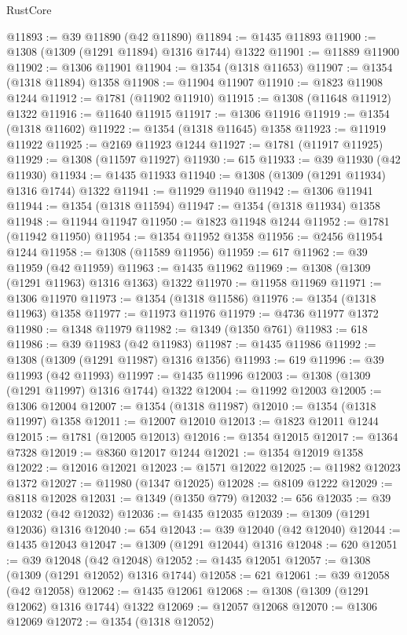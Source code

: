 \begin{lexlean}{RustCore}
\begin{coremodule}
@11893 := @39 @11890 (@42 @11890)
@11894 := @1435 @11893
@11900 := @1308 (@1309 (@1291 @11894) @1316 @1744) @1322
@11901 := @11889 @11900
@11902 := @1306 @11901
@11904 := @1354 (@1318 @11653)
@11907 := @1354 (@1318 @11894) @1358
@11908 := @11904 @11907
@11910 := @1823 @11908 @1244
@11912 := @1781 (@11902 @11910)
@11915 := @1308 (@11648 @11912) @1322
@11916 := @11640 @11915
@11917 := @1306 @11916
@11919 := @1354 (@1318 @11602)
@11922 := @1354 (@1318 @11645) @1358
@11923 := @11919 @11922
@11925 := @2169 @11923 @1244
@11927 := @1781 (@11917 @11925)
@11929 := @1308 (@11597 @11927)
@11930 := 615
@11933 := @39 @11930 (@42 @11930)
@11934 := @1435 @11933
@11940 := @1308 (@1309 (@1291 @11934) @1316 @1744) @1322
@11941 := @11929 @11940
@11942 := @1306 @11941
@11944 := @1354 (@1318 @11594)
@11947 := @1354 (@1318 @11934) @1358
@11948 := @11944 @11947
@11950 := @1823 @11948 @1244
@11952 := @1781 (@11942 @11950)
@11954 := @1354 @11952 @1358
@11956 := @2456 @11954 @1244
@11958 := @1308 (@11589 @11956)
@11959 := 617
@11962 := @39 @11959 (@42 @11959)
@11963 := @1435 @11962
@11969 := @1308 (@1309 (@1291 @11963) @1316 @1363) @1322
@11970 := @11958 @11969
@11971 := @1306 @11970
@11973 := @1354 (@1318 @11586)
@11976 := @1354 (@1318 @11963) @1358
@11977 := @11973 @11976
@11979 := @4736 @11977 @1372
@11980 := @1348 @11979
@11982 := @1349 (@1350 @761)
@11983 := 618
@11986 := @39 @11983 (@42 @11983)
@11987 := @1435 @11986
@11992 := @1308 (@1309 (@1291 @11987) @1316 @1356)
@11993 := 619
@11996 := @39 @11993 (@42 @11993)
@11997 := @1435 @11996
@12003 := @1308 (@1309 (@1291 @11997) @1316 @1744) @1322
@12004 := @11992 @12003
@12005 := @1306 @12004
@12007 := @1354 (@1318 @11987)
@12010 := @1354 (@1318 @11997) @1358
@12011 := @12007 @12010
@12013 := @1823 @12011 @1244
@12015 := @1781 (@12005 @12013)
@12016 := @1354 @12015
@12017 := @1364 @7328
@12019 := @8360 @12017 @1244
@12021 := @1354 @12019 @1358
@12022 := @12016 @12021
@12023 := @1571 @12022
@12025 := @11982 @12023 @1372
@12027 := @11980 (@1347 @12025)
@12028 := @8109 @1222
@12029 := @8118 @12028
@12031 := @1349 (@1350 @779)
@12032 := 656
@12035 := @39 @12032 (@42 @12032)
@12036 := @1435 @12035
@12039 := @1309 (@1291 @12036) @1316
@12040 := 654
@12043 := @39 @12040 (@42 @12040)
@12044 := @1435 @12043
@12047 := @1309 (@1291 @12044) @1316
@12048 := 620
@12051 := @39 @12048 (@42 @12048)
@12052 := @1435 @12051
@12057 := @1308 (@1309 (@1291 @12052) @1316 @1744)
@12058 := 621
@12061 := @39 @12058 (@42 @12058)
@12062 := @1435 @12061
@12068 := @1308 (@1309 (@1291 @12062) @1316 @1744) @1322
@12069 := @12057 @12068
@12070 := @1306 @12069
@12072 := @1354 (@1318 @12052)

\end{coremodule}
\end{lexlean}
